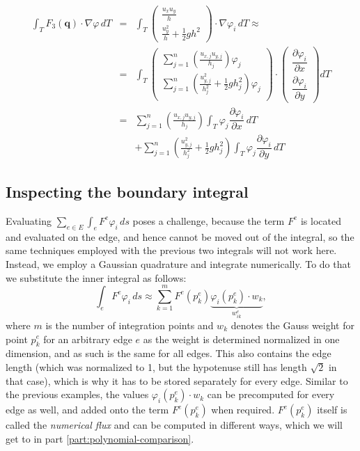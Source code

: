 \documentclass{article}
\newcommand{\pd}[2]{\dfrac{\partial #1}{\partial #2}}
\renewcommand{\phi}{\varphi}
\begin{document}
\begin{eqnarray*}
  \int_T F_3\left(\mathbf{q}\right) \cdot \nabla \phi \, dT & = &
  \int_T
  \begin{pmatrix}
    \frac{u_x u_y}{h} \\ \frac{u_y^2}{h} + \frac{1}{2} g h^2
  \end{pmatrix}
  \cdot \nabla \phi_i \, dT \approx \\
  & = & \int_T
  \begin{pmatrix}
    \sum_{j=1}^n \left(\frac{u_{x,j} u_{y,j}}{h_j}\right) \phi_j \\
    \sum_{j=1}^n \left(\frac{u_{y,j}^2}{h_j^2} + \frac{1}{2} g h_j^2\right) \phi_j \\
  \end{pmatrix}
  \cdot
  \begin{pmatrix}
    \pd{\phi_i}{x} \\
    \pd{\phi_i}{y}
  \end{pmatrix} dT \\
  & = & \sum_{j=1}^n \left(\frac{u_{x,j} u_{y,j}}{h_j}\right) \int_T \phi_j \pd{\phi_i}{x} \, dT \\
  & {} & + \sum_{j=1}^n \left(\frac{u_{y,j}^2}{h_j^2} + \frac{1}{2} g h_j^2\right) \int_T \phi_j \pd{\phi_i}{y} \, dT
\end{eqnarray*}

\subsection{Inspecting the boundary integral}
\label{sec:boundary-integral}

Evaluating $\sum_{e \in E} \int_{e} F^e \phi_i \, ds$ poses a challenge, because the term $F^e$ is located and evaluated on the edge, and hence cannot be moved out of the integral, so the same techniques employed with the previous two integrals will not work here. Instead, we employ a Gaussian quadrature and integrate numerically. To do that we substitute the inner integral as follows:
\begin{equation}
  \int_{e} F^e \phi_i \, ds \approx \sum_{k=1}^{m} F^e\left(p_k^e\right) \underbrace{\phi_i\left(p_k^e\right) \cdot w_k}_{w_{ik}^e},
\end{equation}
where $m$ is the number of integration points and $w_k$ denotes the Gauss weight for point $p_k^e$ for an arbitrary edge $e$ as the weight is determined normalized in one dimension, and as such is the same for all edges. This also contains the edge length (which was normalized to 1, but the hypotenuse still has length $\sqrt{2}$ in that case), which is why it has to be stored separately for every edge. Similar to the previous examples, the values $\phi_i\left(p_k^e\right) \cdot w_k$ can be precomputed for every edge as well, and added onto the term $F^e\left(p_k^e\right)$ when required. $F^e\left(p_k^e\right)$ itself is called the \emph{numerical flux} and can be computed in different ways, which we will get to in part \ref{part:polynomial-comparison}.
\end{document}
